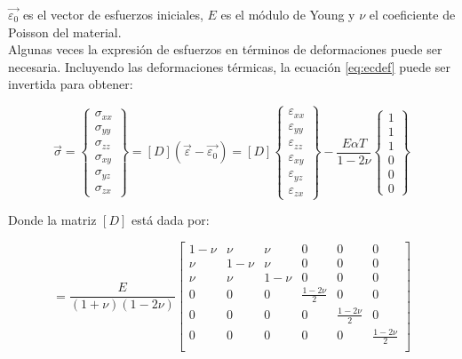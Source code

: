 $\vec{\varepsilon_0}$ es el vector de esfuerzos iniciales, $E$ es el módulo de Young y $\nu$ el coeficiente de Poisson del 
material.\\

Algunas veces la expresión de esfuerzos en términos de deformaciones puede ser necesaria. Incluyendo las deformaciones 
térmicas, la ecuación \ref{eq:ecdef} puede ser invertida para obtener:

\begin{equation}
\vec{\sigma} = 
\left\{\begin{matrix}
\sigma_{xx} \\ \sigma_{yy} \\ \sigma_{zz} \\ \sigma_{xy} \\ \sigma_{yz} \\ \sigma_{zx}
\end{matrix}\right\} = 
\left[ D \right] (\vec{\varepsilon} - \vec{\varepsilon_0})= 
\left[ D \right] 
\left\{\begin{matrix}
\varepsilon_{xx} \\ \varepsilon_{yy} \\ \varepsilon_{zz} \\ \varepsilon_{xy} \\ \varepsilon_{yz} \\ \varepsilon_{zx}
\end{matrix}\right\} - 
\frac{E\alpha T}{1-2\nu}
\left\{\begin{matrix}
1 \\ 1 \\ 1 \\ 0 \\ 0 \\ 0
\end{matrix}\right\} 
\end{equation}

Donde la matriz $[D]$ está dada por:

\begin{equation}
[C] = \frac{E}{(1+\nu)(1-2\nu)}
\left[\begin{matrix}
1-\nu & \nu & \nu & 0 & 0 & 0 \\
\nu & 1-\nu & \nu & 0 & 0 & 0 \\
\nu & \nu & 1-\nu & 0 & 0 & 0 \\
0 & 0 & 0 & \frac{1-2\nu}{2} & 0 & 0 \\
0 & 0 & 0 & 0 & \frac{1-2\nu}{2} & 0 \\
0 & 0 & 0 & 0 & 0 & \frac{1-2\nu}{2} \\
\end{matrix}\right]
\end{equation}

